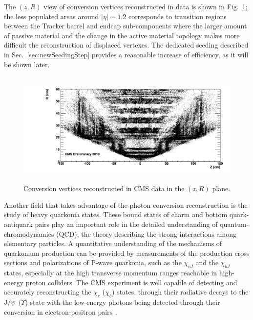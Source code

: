 \documentclass[a4paper]{jpconf}
\def \JPsi{\rm J/\psi}
\begin{document}
%
The  $(z, R)$  view of conversion vertices reconstructed in data is  shown in Fig.~\ref{fig:convRZ};  the less populated
areas  around $|\eta|\sim1.2$ corresponds to transition regions between the Tracker
barrel and endcap sub-components where the larger amount of passive material and the change in the active material topology makes more difficult the reconstruction of displaced vertexes. 
The dedicated seeding described in Sec.~\ref{sec:newSeedingStep} provides a reasonable increase of efficiency, as it will be shown later.


\begin{figure}[h!]
  \begin{center}
     \includegraphics[width=17cm,height=5.7cm]{fig/conversions/ptCut/data_rz.png}
      \caption{Conversion vertices reconstructed in CMS data in the $(z,R)$ plane.}
    \label{fig:convRZ}
  \end{center}
\end{figure}



Another field that takes advantage of the photon conversion reconstruction is the study of heavy quarkonia states. These bound states of charm and bottom quark-antiquark pairs play an important role in the detailed understanding of quantum-chromodynamics 
(QCD), the theory describing the strong interactions among elementary particles. 
A quantitative understanding of the mechanisms of quarkonium production can
be provided by measurements of the production cross sections and 
polarizations of P-wave quarkonia, such as the $\chi_{cJ}$ and the 
$\chi_{bJ}$ states, especially at the high transverse momentum ranges
reachable in high-energy proton colliders.
The CMS experiment is well capable 
of detecting and accurately reconstructing the $\chi_{c}$ ($\chi_{b}$)
states, through their radiative decays to the $\JPsi$ ($\Upsilon$)
state with the low-energy photons being detected through their conversion 
in electron-positron pairs~\cite{chic}. 
\end{document}
